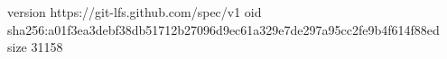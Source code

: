 version https://git-lfs.github.com/spec/v1
oid sha256:a01f3ea3debf38db51712b27096d9ec61a329e7de297a95cc2fe9b4f614f88ed
size 31158
